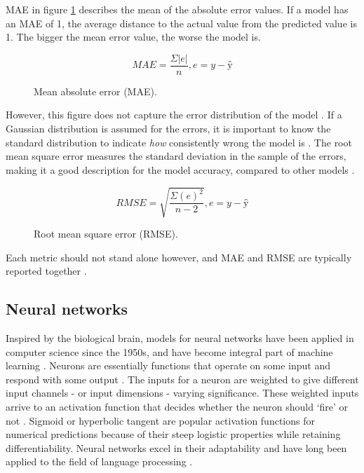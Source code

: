 \documentclass[a4paper]{article}
\begin{document}
MAE in figure \ref{fig:mae} describes the mean of the absolute error values.
If a model has an MAE of 1, the average distance to the actual value from the
predicted value is 1. The bigger the mean error value, the worse the model is.

\begin{figure}
\[MAE = \frac{\Sigma |e|}{n}, e = y - ŷ\]
\caption{Mean absolute error (MAE).}
\label{fig:mae}
\end{figure}

However, this figure does not capture the error distribution of the model
\citep{Chai2014}. If
a Gaussian distribution is assumed for the errors, it is important to know
the standard distribution to indicate \textit{how} consistently wrong the model
is \citep{Agresti2008}. The root mean square error measures the standard
deviation in the sample of the errors, making it a good description for the
model accuracy, compared to other models \citep{Agresti2008, Chai2014}.

\begin{figure}
\[ RMSE = \sqrt{\frac{\Sigma (e)^{2}}{n - 2}}, e = y - ŷ \]
\caption{Root mean square error (RMSE).}
\label{fig:rmse}
\end{figure}

Each metric should not stand alone however, and MAE and RMSE are typically
reported together \citep{Chai2014}.

\subsection{Neural networks}
Inspired by the biological brain, models for neural networks have been applied
in computer science since the 1950s, and have become integral part of machine
learning \citep{NILSSON2009, Russell2009}.
Neurons are essentially functions that operate on some input and respond with
some output \citep{Russell2009}. The inputs for a neuron are weighted to give
different input channels - or input dimensions - varying significance. These
weighted inputs arrive to an activation function that decides whether the
neuron should ‘fire’ or not \citep{NILSSON2009}. Sigmoid or hyperbolic tangent
are popular
activation functions for numerical predictions because of their steep logistic
properties while retaining differentiability. Neural networks excel in their
adaptability and have long been applied to the field of language processing
\citep{Jurafsky2000}.
\end{document}
